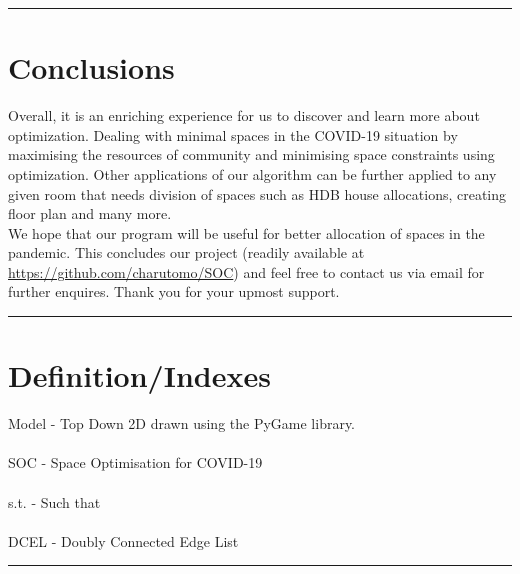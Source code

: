 \documentclass{article}
\begin{document}
\par\noindent\rule{\textwidth}{0.4pt}
\newpage
\section{Conclusions}
Overall, it is an enriching experience for us to discover and learn more about optimization. Dealing with minimal spaces in the COVID-19 situation by maximising the resources of community and minimising space constraints using optimization. Other applications of our algorithm can be further applied to any given room that needs division of spaces such as HDB house allocations, creating floor plan and many more.\\
\newline
We hope that our program will be useful for better allocation of spaces in the pandemic. This concludes our project (readily available at \url{https://github.com/charutomo/SOC}) and feel free to contact us via email for further enquires. Thank you for your upmost support.\\
\par\noindent\rule{\textwidth}{0.4pt}

\section{Definition/Indexes}
Model - Top Down 2D drawn using the PyGame library. \\\\
SOC - Space Optimisation for COVID-19\\\\
s.t. - Such that\\\\
DCEL - Doubly Connected Edge List \\
\par\noindent\rule{\textwidth}{0.4pt}


\newpage
\end{document}
